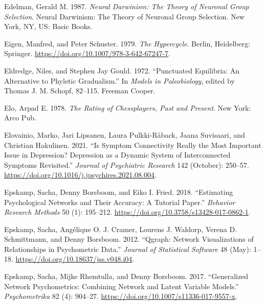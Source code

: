 \documentclass[
  a4paper,
  DIV=11,
  numbers=noendperiod,
  oneside]{scrreprt}
\newlength{\cslhangindent}
\newenvironment{CSLReferences}[2] %
 {\begin{list}{}{%
  \setlength{\itemindent}{0pt}
  \setlength{\leftmargin}{0pt}
  \setlength{\parsep}{0pt}
  \ifodd #1
   \setlength{\leftmargin}{\cslhangindent}
   \setlength{\itemindent}{-1\cslhangindent}
  \fi
  \setlength{\itemsep}{#2\baselineskip}}}
 {\end{list}}
\begin{document}
\begin{CSLReferences}{1}{0}
Edelman, Gerald M. 1987. \emph{Neural {Darwinism}: {The} Theory of
Neuronal Group Selection}. Neural {Darwinism}: {The} Theory of Neuronal
Group Selection. {New York, NY, US}: {Basic Books}.

Eigen, Manfred, and Peter Schuster. 1979. \emph{The {Hypercycle}}.
{Berlin, Heidelberg}: {Springer}.
\url{https://doi.org/10.1007/978-3-642-67247-7}.

Eldredge, Niles, and Stephen Jay Gould. 1972. {``Punctuated
{Equilibria}: {An Alternative} to {Phyletic Gradualism}.''} In
\emph{Models in {Paleobiology}}, edited by Thomas J. M. Schopf, 82--115.
{Freeman Cooper}.

Elo, Arpad E. 1978. \emph{The Rating of Chessplayers, Past and Present}.
{New York}: {Arco Pub}.

Elovainio, Marko, Jari Lipsanen, Laura Pulkki-Råback, Jaana Suvisaari,
and Christian Hakulinen. 2021. {``Is Symptom Connectivity Really the
Most Important Issue in Depression? {Depression} as a Dynamic System of
Interconnected Symptoms Revisited.''} \emph{Journal of Psychiatric
Research} 142 (October): 250--57.
\url{https://doi.org/10.1016/j.jpsychires.2021.08.004}.

Epskamp, Sacha, Denny Borsboom, and Eiko I. Fried. 2018. {``Estimating
Psychological Networks and Their Accuracy: {A} Tutorial Paper.''}
\emph{Behavior Research Methods} 50 (1): 195--212.
\url{https://doi.org/10.3758/s13428-017-0862-1}.

Epskamp, Sacha, Angélique O. J. Cramer, Lourens J. Waldorp, Verena D.
Schmittmann, and Denny Borsboom. 2012. {``Qgraph: {Network
Visualizations} of {Relationships} in {Psychometric Data}.''}
\emph{Journal of Statistical Software} 48 (May): 1--18.
\url{https://doi.org/10.18637/jss.v048.i04}.

Epskamp, Sacha, Mijke Rhemtulla, and Denny Borsboom. 2017.
{``Generalized {Network Psychometrics}: {Combining Network} and {Latent
Variable Models}.''} \emph{Psychometrika} 82 (4): 904--27.
\url{https://doi.org/10.1007/s11336-017-9557-x}.


\end{CSLReferences}
\end{document}

